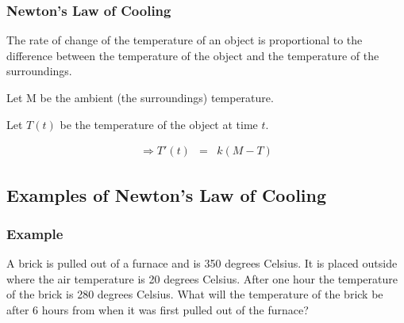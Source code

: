 \begin{frame}
  \frametitle{Newton's Law of Cooling \\
    }

  {\color{red}The rate of change of the temperature of an object is 
  proportional to the difference between the temperature of the 
  object and the temperature of the surroundings.}

  \vfill

  Let M be the ambient (the surroundings) temperature.  

  Let $T(t)$ be the temperature of the object at time $t$. 

  \begin{eqnarray*}
    \Rightarrow T'(t) & = & k (M-T)
  \end{eqnarray*}


\end{frame}

\subsection{Examples of Newton's Law of Cooling }

\begin{frame}
  \frametitle{Example \\
    }

  {\color{red}A brick is pulled out of a furnace and is 350 degrees Celsius.} 
  {\color{blue}It is placed outside where the air temperature is 20 degrees Celsius.} 
  {\color{green}After one hour the temperature of the brick is 280
    degrees Celsius.}  
  What will the temperature of the brick be after 6 hours from when it
  was first pulled out of the furnace?


\end{frame}


